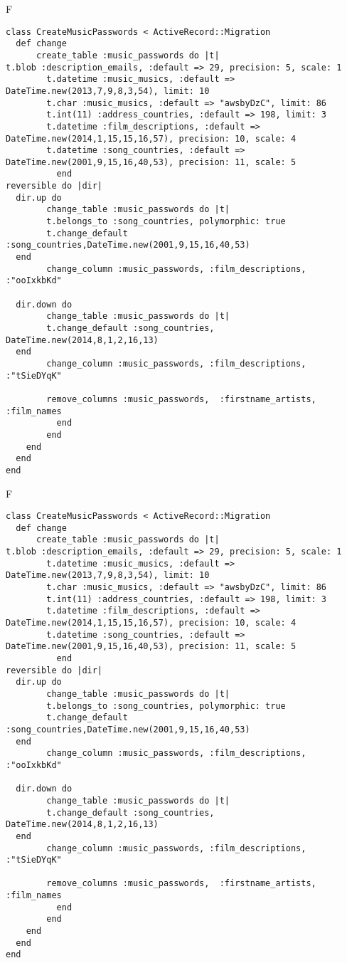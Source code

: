 F
\begin{verbatim}
class CreateMusicPasswords < ActiveRecord::Migration
  def change
	  create_table :music_passwords do |t|
t.blob :description_emails, :default => 29, precision: 5, scale: 1
		t.datetime :music_musics, :default => DateTime.new(2013,7,9,8,3,54), limit: 10
		t.char :music_musics, :default => "awsbyDzC", limit: 86
		t.int(11) :address_countries, :default => 198, limit: 3
		t.datetime :film_descriptions, :default => DateTime.new(2014,1,15,15,16,57), precision: 10, scale: 4
		t.datetime :song_countries, :default => DateTime.new(2001,9,15,16,40,53), precision: 11, scale: 5
		  end
reversible do |dir|
  dir.up do
		change_table :music_passwords do |t|
		t.belongs_to :song_countries, polymorphic: true
 		t.change_default :song_countries,DateTime.new(2001,9,15,16,40,53)
  end
 		change_column :music_passwords, :film_descriptions, :"ooIxkbKd"
   
  dir.down do
		change_table :music_passwords do |t|
		t.change_default :song_countries, DateTime.new(2014,8,1,2,16,13)
  end
 		change_column :music_passwords, :film_descriptions, :"tSieDYqK"
   
		remove_columns :music_passwords,  :firstname_artists, :film_names 
	      end
	    end
    end 
  end
end

\end{verbatim}

F
\begin{verbatim}
class CreateMusicPasswords < ActiveRecord::Migration
  def change
	  create_table :music_passwords do |t|
t.blob :description_emails, :default => 29, precision: 5, scale: 1
		t.datetime :music_musics, :default => DateTime.new(2013,7,9,8,3,54), limit: 10
		t.char :music_musics, :default => "awsbyDzC", limit: 86
		t.int(11) :address_countries, :default => 198, limit: 3
		t.datetime :film_descriptions, :default => DateTime.new(2014,1,15,15,16,57), precision: 10, scale: 4
		t.datetime :song_countries, :default => DateTime.new(2001,9,15,16,40,53), precision: 11, scale: 5
		  end
reversible do |dir|
  dir.up do
		change_table :music_passwords do |t|
		t.belongs_to :song_countries, polymorphic: true
 		t.change_default :song_countries,DateTime.new(2001,9,15,16,40,53)
  end
 		change_column :music_passwords, :film_descriptions, :"ooIxkbKd"
   
  dir.down do
		change_table :music_passwords do |t|
		t.change_default :song_countries, DateTime.new(2014,8,1,2,16,13)
  end
 		change_column :music_passwords, :film_descriptions, :"tSieDYqK"
   
		remove_columns :music_passwords,  :firstname_artists, :film_names 
	      end
	    end
    end 
  end
end

\end{verbatim}

